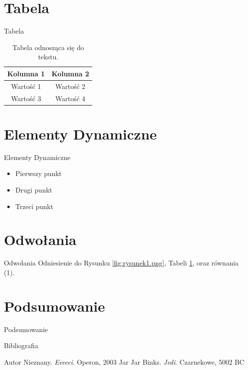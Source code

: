 \documentclass{beamer}
\begin{document}
\section{Tabela}
\begin{frame}{Tabela}
    \begin{table}[h]
        \centering
        \begin{tabular}{|c|c|}
            \hline
            Kolumna 1 & Kolumna 2 \\
            \hline
            Wartość 1 & Wartość 2 \\
            \hline
            Wartość 3 & Wartość 4 \\
            \hline
        \end{tabular}
        \caption{Tabela odnosząca się do tekstu.}
        \label{tab:tabela1}
    \end{table}
\end{frame}

\section{Elementy Dynamiczne}
\begin{frame}{Elementy Dynamiczne}
    \begin{itemize}
        \item<1-> Pierwszy punkt
        \item<2-> Drugi punkt
        \item<3-> Trzeci punkt
    \end{itemize}
\end{frame}

\section{Odwołania}
\begin{frame}{Odwołania}
    Odniesienie do Rysunku \ref{fig:rysunek1.png}, Tabeli \ref{tab:tabela1}, oraz równania (1).
\end{frame}

\section{Podsumowanie}
\begin{frame}{Podsumowanie}
    \lipsum[16]
\end{frame}

\begin{frame}{Bibliografia}
    \begin{thebibliography}{9}
         Autor Nieznany. \emph{Eeeeei}. Operon, 2003
         Jar Jar Binks. \emph{Jedi}. Czarnekowe, 5002 BC
    \end{thebibliography}
\end{frame}
\end{document}
